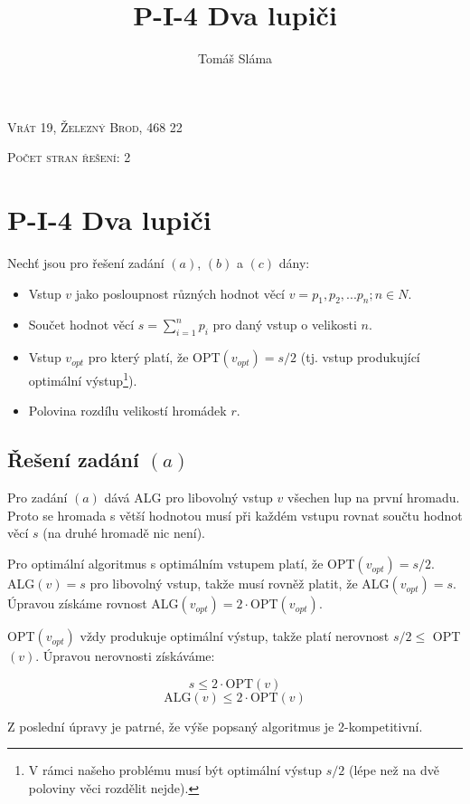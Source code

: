 \documentclass[a4paper, 12pt]{article}
\title{P-I-4 Dva lupiči}
\author{Tomáš Sláma}
\date{}
\begin{document}
  \maketitle

  \bigskip
  \begin{center}
    \textsc{Vrát 19, Železný Brod, 468 22}

    \textsc{Počet stran řešení: 2}
  \end{center}

  \newpage

  \section{P-I-4 Dva lupiči}
  Nechť jsou pro řešení zadání $(a)$, $(b)$ a $(c)$ dány:
  \begin{itemize}[noitemsep]
    \item Vstup $v$ jako posloupnost různých hodnot věcí $v=p_1, p_2,...p_n; n \in N$.
    \item Součet hodnot věcí $s=\sum\limits_{i=1}^n p_i$ pro daný vstup o velikosti $n$.
    \item Vstup $v_{opt}$ pro který platí, že OPT$(v_{opt})=s/2$ (tj. vstup produkující optimální výstup\footnote{V rámci našeho problému musí být optimální výstup $s/2$ (lépe než na dvě poloviny věci rozdělit nejde).}).
    \item Polovina rozdílu velikostí hromádek $r$.
  \end{itemize}

  \subsection{Řešení zadání $(a)$}
  Pro zadání $(a)$ dává ALG pro libovolný vstup $v$ všechen lup na první hromadu. Proto se hromada s větší hodnotou musí při každém vstupu rovnat součtu hodnot věcí $s$ (na druhé hromadě nic není).

  Pro optimální algoritmus s optimálním vstupem platí, že OPT$(v_{opt})=s/2$.
  ALG$(v)=s$ pro libovolný vstup, takže musí rovněž platit, že ALG$(v_{opt})=s$. Úpravou získáme rovnost ALG$(v_{opt}) = 2 \cdot$OPT$(v_{opt})$.

  OPT$(v_{opt})$ vždy produkuje optimální výstup, takže platí nerovnost $s/2 \le$ OPT$(v)$. Úpravou nerovnosti získáváme:

  $$s \le 2\cdot\text{OPT}(v)$$
  $$\text{ALG}(v) \le 2 \cdot\text{OPT}(v)$$

  Z poslední úpravy je patrné, že výše popsaný algoritmus je 2-kompetitivní.
\end{document}
